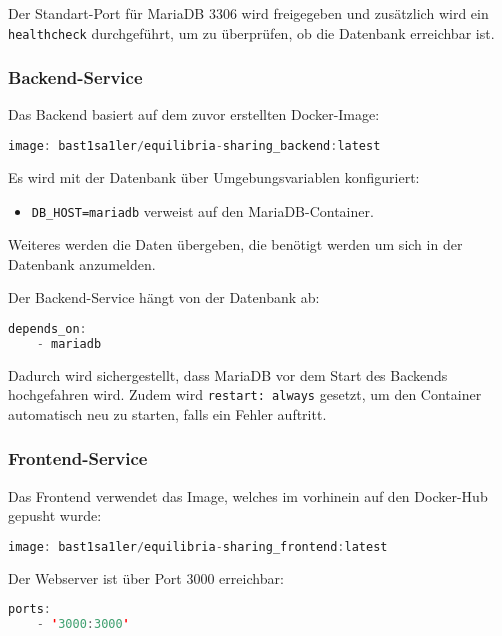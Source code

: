 	\noindent Der Standart-Port für MariaDB 3306 wird freigegeben und zusätzlich wird ein \texttt{healthcheck} durchgeführt, um zu überprüfen, ob die Datenbank erreichbar ist.
	
	\subsubsection{Backend-Service}
	\label{sec:backend}
	Das Backend basiert auf dem zuvor erstellten Docker-Image:
	
	\begin{lstlisting}[language=Java]
image: bast1sa1ler/equilibria-sharing_backend:latest
	\end{lstlisting}
	
	\noindent Es wird mit der Datenbank über Umgebungsvariablen konfiguriert:
	
	\begin{itemize}
		\item \texttt{DB\_HOST=mariadb} verweist auf den MariaDB-Container.
	\end{itemize}
	
	\noindent Weiteres werden die Daten übergeben, die benötigt werden um sich in der Datenbank anzumelden.
	
	\noindent Der Backend-Service hängt von der Datenbank ab:
	
	\begin{lstlisting}[language=Java]
depends_on:
	- mariadb
	\end{lstlisting}
	
	\noindent Dadurch wird sichergestellt, dass MariaDB vor dem Start des Backends hochgefahren wird. Zudem wird \texttt{restart: always} gesetzt, um den Container automatisch neu zu starten, falls ein Fehler auftritt.
	
	\subsubsection{Frontend-Service}
	\label{sec:frontend}
	Das Frontend verwendet das Image, welches im vorhinein auf den Docker-Hub gepusht wurde:
	
	\begin{lstlisting}[language=Java]
image: bast1sa1ler/equilibria-sharing_frontend:latest
	\end{lstlisting}
	
	\noindent Der Webserver ist über Port 3000 erreichbar:
	
	\begin{lstlisting}[language=Java]
ports:
	- '3000:3000'
	\end{lstlisting}
	

